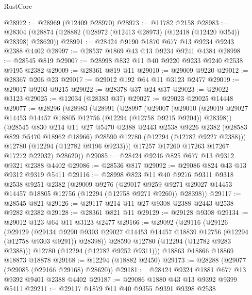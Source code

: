 \begin{lexlean}{RustCore}
\begin{coremodule}
@28972 := @28969 (@12409 @28970)
@28973 := @11782 @2158
@28983 := @28304 (@28874 (@28882 (@28972 (@12413 @28973) (@12418 (@12420 @354)) @28398) @28620))
@28991 := @28424 @9190 @1870 @677 @13 @9234 @9243 @2388 @4402
@28997 := @28537 @1869 @43 @13 @9234 @9241 @4384
@28998 := @28545 @819
@29007 := @28998 @832 @11 @40 @9220 @9233 @9240 @2538 @9195 @2382
@29009 := @28361 @819 @11
@29010 := @29009 @9220
@29012 := @28367 @206 @23
@29017 := @29012 @192 @64 @11 @3123 @2477
@29019 := @29017 @9203 @9215
@29022 := @28378 @37 @24 @37
@29023 := @29022 @3123
@29025 := @12034 (@28383 @37)
@29027 := @29023 @29025 @14448
@29077 := @28296
    (@28983
      (@28991
        (@28997
          (@29007
            (@29010
              (@29019 @29027 @14453 @14457 @18805 @12756 (@12294 (@12758 @9215 @9204)) @28398))
            (@28545
              @830
              @214
              @11
              @27
              @5470
              @2388
              @2443
              @2538
              @9226
              @2382
              (@28583 @829 @5470 @18962 @18966)
              @28590
              @12780
              (@12294 (@12782 @9227 @2388)))
            @12780
            (@12294 (@12782 @9196 @9233)))
          @17257
          @17260
          @17263
          @17267
          @17272
          @22032)
        @28620))
@29085 := @28424 @9246 @825 @677 @13 @9312 @9321 @2388 @4402
@29086 := @28536 @817
@29092 := @29086 @824 @43 @13 @9312 @9319 @5411
@29116 := @28998
    @823
    @11
    @40
    @9276
    @9311
    @9318
    @2538
    @9251
    @2382
    (@29009
      @9276
      (@29017 @9259 @9271 @29027 @14453 @14457 @18805 @12756 (@12294 (@12758 @9271 @9260)) @28398))
@29117 := @28545 @821
@29126 := @29117 @214 @11 @27 @9308 @2388 @2443 @2538 @9282 @2382
@29128 := @28361 @821 @11
@29129 := @29128 @9308
@29134 := @29012 @123 @64 @11 @3123 @2477
@29166 := @29092
    (@29116
      (@29126
        (@29129
          (@29134
            @9290
            @9303
            @29027
            @14453
            @14457
            @18839
            @12756
            (@12294 (@12758 @9303 @9291))
            @28398))
        @28590
        @12780
        (@12294 (@12782 @9283 @2388)))
      @12780
      (@12294 (@12782 @9252 @9311)))
    @18863
    @18866
    @18869
    @18873
    @18878
@29168 := @12294 (@18882 @2450)
@29173 := @28288 (@29077 (@29085 (@29166 @29168) @28620))
@29181 := @28424 @9324 @1881 @677 @13 @9392 @9401 @2388 @4402
@29187 := @29086 @1880 @43 @13 @9392 @9399 @5411
@29211 := @29117
    @1879
    @11
    @40
    @9355
    @9391
    @9398
    @2538

\end{coremodule}
\end{lexlean}
